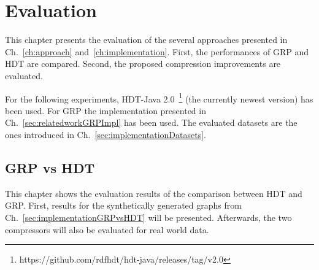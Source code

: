 \chapter{Evaluation}\label{ch:evaluation}

This chapter presents the evaluation of the several approaches presented in Ch.~\ref{ch:approach} and~\ref{ch:implementation}.  First, the performances of GRP and HDT are compared. Second, the proposed compression improvements are evaluated.

For the following experiments, HDT-Java 2.0~\footnote{\label{foot:1}https://github.com/rdfhdt/hdt-java/releases/tag/v2.0} (the currently newest version) has been used. For GRP the implementation presented in Ch.~\ref{sec:relatedworkGRPImpl} has been used. The evaluated datasets are the ones introduced in Ch.~\ref{sec:implementationDatasets}.


\section{GRP vs HDT}\label{sec:evaluationHDTvsGRP}

This chapter shows the evaluation results of the comparison between HDT and GRP. First, results for the synthetically generated graphs from Ch.~\ref{sec:implementationGRPvsHDT} will be presented. Afterwards, the two compressors will also be evaluated for real world data.

